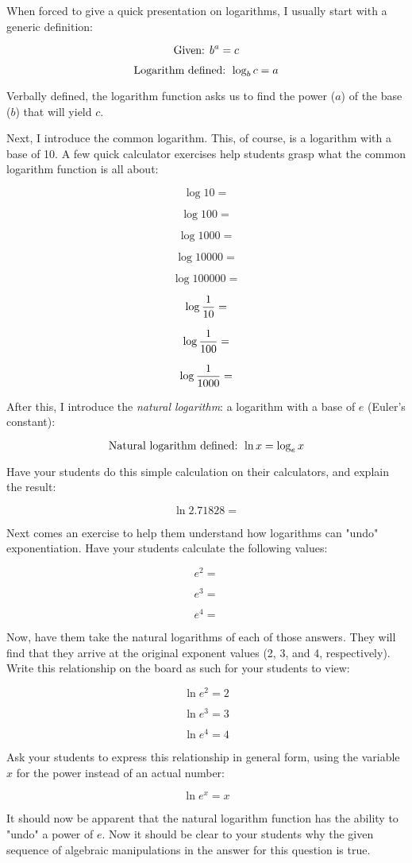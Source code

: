 When forced to give a quick presentation on logarithms, I usually start with a generic definition:

$$\hbox{Given: } b^a = c$$

$$\hbox{Logarithm defined: } \log_b c = a$$

Verbally defined, the logarithm function asks us to find the power ($a$) of the base ($b$) that will yield $c$.

\vskip 10pt

Next, I introduce the common logarithm.  This, of course, is a logarithm with a base of 10.  A few quick calculator exercises help students grasp what the common logarithm function is all about:

$$\log 10 = $$

$$\log 100 = $$

$$\log 1000 = $$

$$\log 10000 = $$

$$\log 100000 = $$

$$\log {1 \over 10} = $$

$$\log {1 \over 100} = $$

$$\log {1 \over 1000} = $$

After this, I introduce the {\it natural logarithm}: a logarithm with a base of $e$ (Euler's constant):

$$\hbox{Natural logarithm defined: } \ln x = \log_e x$$

Have your students do this simple calculation on their calculators, and explain the result:

$$\ln 2.71828 = $$

Next comes an exercise to help them understand how logarithms can "undo" exponentiation.  Have your students calculate the following values:

$$e^2 = $$

$$e^3 = $$

$$e^4 = $$

Now, have them take the natural logarithms of each of those answers.  They will find that they arrive at the original exponent values (2, 3, and 4, respectively).  Write this relationship on the board as such for your students to view:

$$\ln e^2 = 2$$

$$\ln e^3 = 3$$

$$\ln e^4 = 4$$

Ask your students to express this relationship in general form, using the variable $x$ for the power instead of an actual number:

$$\ln e^x = x$$

It should now be apparent that the natural logarithm function has the ability to "undo" a power of $e$.  Now it should be clear to your students why the given sequence of algebraic manipulations in the answer for this question is true.




